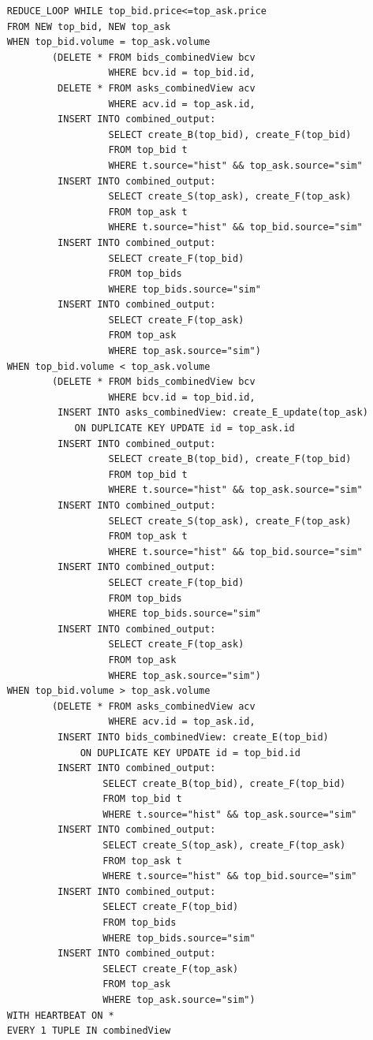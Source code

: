 \documentclass{article}
\begin{document}
\begin{verbatim}  
    REDUCE_LOOP WHILE top_bid.price<=top_ask.price
    FROM NEW top_bid, NEW top_ask
    WHEN top_bid.volume = top_ask.volume 
            (DELETE * FROM bids_combinedView bcv 
                      WHERE bcv.id = top_bid.id,
             DELETE * FROM asks_combinedView acv 
                      WHERE acv.id = top_ask.id,
             INSERT INTO combined_output:
                      SELECT create_B(top_bid), create_F(top_bid)
                      FROM top_bid t
                      WHERE t.source="hist" && top_ask.source="sim"
             INSERT INTO combined_output:
                      SELECT create_S(top_ask), create_F(top_ask)
                      FROM top_ask t
                      WHERE t.source="hist" && top_bid.source="sim"
             INSERT INTO combined_output: 
                      SELECT create_F(top_bid)
                      FROM top_bids
                      WHERE top_bids.source="sim"
             INSERT INTO combined_output: 
                      SELECT create_F(top_ask)
                      FROM top_ask
                      WHERE top_ask.source="sim")
    WHEN top_bid.volume < top_ask.volume 
            (DELETE * FROM bids_combinedView bcv 
                      WHERE bcv.id = top_bid.id,
             INSERT INTO asks_combinedView: create_E_update(top_ask)
                ON DUPLICATE KEY UPDATE id = top_ask.id
             INSERT INTO combined_output:
                      SELECT create_B(top_bid), create_F(top_bid)
                      FROM top_bid t
                      WHERE t.source="hist" && top_ask.source="sim"
             INSERT INTO combined_output:
                      SELECT create_S(top_ask), create_F(top_ask)
                      FROM top_ask t
                      WHERE t.source="hist" && top_bid.source="sim"
             INSERT INTO combined_output: 
                      SELECT create_F(top_bid)
                      FROM top_bids
                      WHERE top_bids.source="sim"
             INSERT INTO combined_output: 
                      SELECT create_F(top_ask)
                      FROM top_ask
                      WHERE top_ask.source="sim")
    WHEN top_bid.volume > top_ask.volume 
            (DELETE * FROM asks_combinedView acv 
                      WHERE acv.id = top_ask.id,
             INSERT INTO bids_combinedView: create_E(top_bid) 
                 ON DUPLICATE KEY UPDATE id = top_bid.id
             INSERT INTO combined_output:
                     SELECT create_B(top_bid), create_F(top_bid)
                     FROM top_bid t
                     WHERE t.source="hist" && top_ask.source="sim"
             INSERT INTO combined_output:
                     SELECT create_S(top_ask), create_F(top_ask)
                     FROM top_ask t
                     WHERE t.source="hist" && top_bid.source="sim"
             INSERT INTO combined_output: 
                     SELECT create_F(top_bid)
                     FROM top_bids
                     WHERE top_bids.source="sim"
             INSERT INTO combined_output: 
                     SELECT create_F(top_ask)
                     FROM top_ask
                     WHERE top_ask.source="sim")
    WITH HEARTBEAT ON *
    EVERY 1 TUPLE IN combinedView
\end{verbatim}
\end{document}
